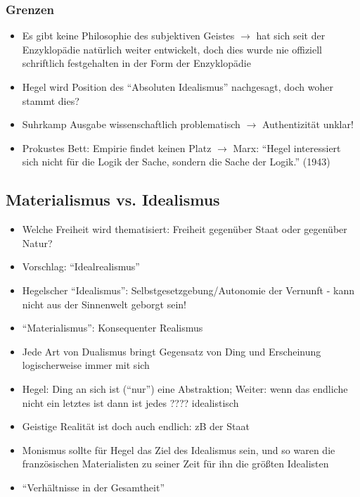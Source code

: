 \documentclass[emulatestandardclasses]{scrartcl}
\begin{document}
\subsubsection{Grenzen}

\begin{itemize}
  \item Es gibt keine Philosophie des subjektiven Geistes $\rightarrow$ hat sich seit der Enzyklopädie natürlich weiter entwickelt, doch dies wurde nie offiziell schriftlich festgehalten in der Form der Enzyklopädie
  \item Hegel wird Position des "`Absoluten Idealismus"' nachgesagt, doch woher stammt dies?
  \item Suhrkamp Ausgabe wissenschaftlich problematisch $\rightarrow$ Authentizität unklar! 
  \item Prokustes Bett: Empirie findet keinen Platz $\rightarrow$ Marx: "`Hegel interessiert sich nicht für die Logik der Sache, sondern die Sache der Logik."' (1943)
\end{itemize}

\subsection{Materialismus vs. Idealismus}

\begin{itemize}
  \item Welche Freiheit wird thematisiert: Freiheit gegenüber Staat oder gegenüber Natur?
  \item Vorschlag: "`Idealrealismus"'
  \item Hegelscher "`Idealismus"': Selbstgesetzgebung/Autonomie der Vernunft - kann nicht aus der Sinnenwelt geborgt sein!
  \item "`Materialismus"': Konsequenter Realismus
  \item Jede Art von Dualismus bringt Gegensatz von Ding und Erscheinung logischerweise immer mit sich
  \item Hegel: Ding an sich ist ("`nur"') eine Abstraktion; Weiter: wenn das endliche nicht ein letztes ist dann ist jedes ???? idealistisch
  \item Geistige Realität ist doch auch endlich: zB der Staat
  \item Monismus sollte für Hegel das Ziel des Idealismus sein, und so waren die französischen Materialisten zu seiner Zeit für ihn die größten Idealisten
  \item "`Verhältnisse in der Gesamtheit"'
\end{itemize}
\end{document}
